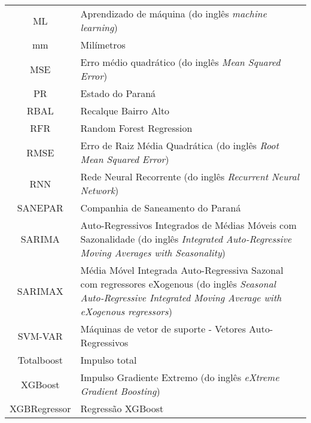 \begin{tabular}{cp{}}
	ML & Aprendizado de máquina (do inglês \textit{machine learning})\\
	mm & Milímetros\\
	MSE & Erro médio quadrático (do inglês \textit{Mean Squared Error})\\
	PR & Estado do Paraná\\
	RBAL & Recalque Bairro Alto\\
	RFR & Random Forest Regression\\
	RMSE & Erro de Raiz Média Quadrática (do inglês \textit{Root Mean Squared Error})\\
	RNN & Rede Neural Recorrente (do inglês \textit{Recurrent Neural Network})\\
	SANEPAR & Companhia de Saneamento do Paraná \\
	SARIMA & Auto-Regressivos Integrados de Médias Móveis com Sazonalidade (do inglês \textit{Integrated Auto-Regressive Moving Averages with Seasonality}) \\
	SARIMAX &  Média Móvel Integrada Auto-Regressiva Sazonal com regressores eXogenous (do inglês \textit{Seasonal Auto-Regressive Integrated Moving Average with eXogenous regressors}) \\
	SVM-VAR & Máquinas de vetor de suporte - Vetores Auto-Regressivos\\
	Totalboost & Impulso total\\
	XGBoost & Impulso Gradiente Extremo (do inglês \textit{eXtreme Gradient Boosting})\\
	XGBRegressor & Regressão XGBoost
\end{tabular}






\newpage 
{}
\listoftables
\cleardoublepage

\newpage 
{}
\listoffigures 


%


